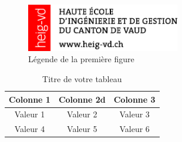 



\begin{figure}
    \centering
    \includegraphics[width=0.6\textwidth]{HEIG_1.png}
    \caption{Légende de la première figure}
  \end{figure}

\begin{table}[h] %
    \centering %
    \caption{Titre de votre tableau} %
    \begin{tabular}{|c|c|c|} %
        \hline %
        Colonne 1 & Colonne 2d & Colonne 3 \\ %
        \hline %
        Valeur 1 & Valeur 2 & Valeur 3 \\ %
        Valeur 4 & Valeur 5 & Valeur 6 \\ %
        \hline %
    \end{tabular}
\end{table}